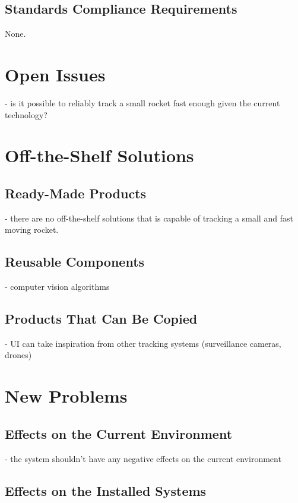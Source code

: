 \documentclass[12pt]{article}
\begin{document}
\subsection{Standards Compliance Requirements}

None.

\section{Open Issues}

- is it possible to reliably track a small rocket fast enough given the current technology?

\section{Off-the-Shelf Solutions}
\subsection{Ready-Made Products}

- there are no off-the-shelf solutions that is capable of tracking a small and fast moving rocket.

\subsection{Reusable Components}

- computer vision algorithms

\subsection{Products That Can Be Copied}

- UI can take inspiration from other tracking systems (surveillance cameras, drones)

\section{New Problems}
\subsection{Effects on the Current Environment}

- the system shouldn't have any negative effects on the current environment

\subsection{Effects on the Installed Systems}
\end{document}
